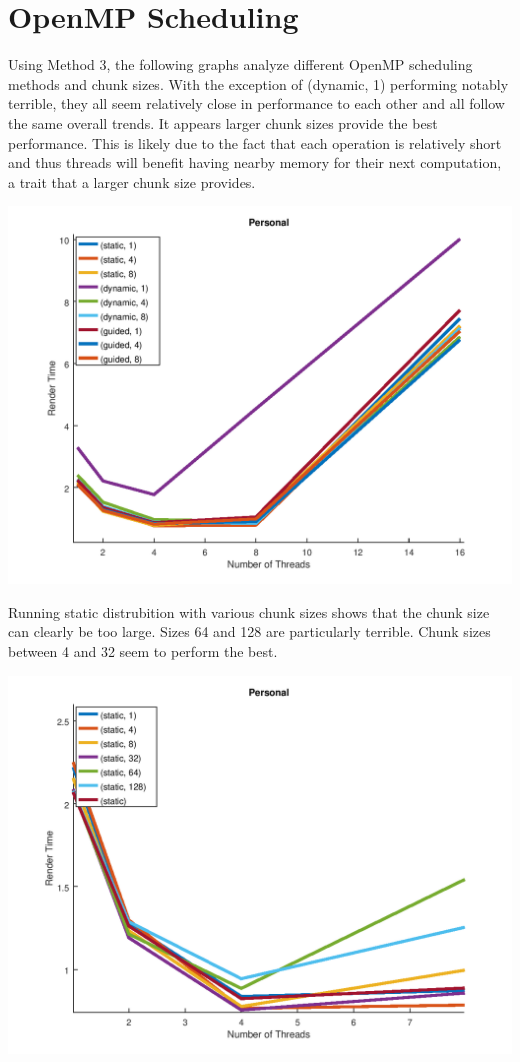 \documentclass[12pt]{article}
\begin{document}
\section*{OpenMP Scheduling}

Using Method 3, the following graphs analyze different OpenMP scheduling methods and chunk sizes.
With the exception of (dynamic, 1) performing notably terrible, they all seem relatively close in performance
to each other and all follow the same overall trends. It appears larger chunk sizes provide the best performance.
This is likely due to the fact that each operation is relatively short and thus threads will benefit having
nearby memory for their next computation, a trait that a larger chunk size provides.
\begin{center}
	\includegraphics[scale=0.5]{scheduling_personal.png}
\end{center}
Running static distrubition with various chunk sizes shows that the chunk size can clearly be too large.
Sizes 64 and 128 are particularly terrible. Chunk sizes between 4 and 32 seem to perform the best.
\begin{center}
	\includegraphics[scale=0.5]{static_personal.png}
\end{center}
\end{document}
